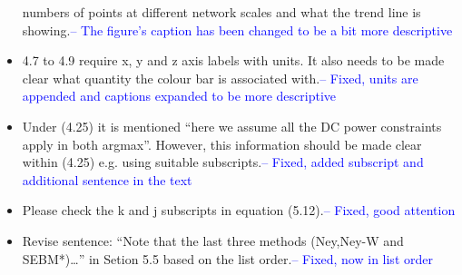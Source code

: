 \documentclass{article}
\begin{document}
\begin{itemize}
numbers of points at different network scales and what the trend line is
showing.\textcolor{blue}{-- The figure's caption has been changed to be a bit more descriptive}
\item	4.7 to 4.9 require x, y and z axis labels with units. It also needs to be made
clear what quantity the colour bar is associated with.\textcolor{blue}{-- Fixed, units are appended and captions expanded to be more descriptive}
\item	Under (4.25) it is mentioned “here we assume all the DC power constraints
apply in both argmax”. However, this information should be made clear within
(4.25) e.g. using suitable subscripts.\textcolor{blue}{-- Fixed, added subscript and additional sentence in the text}
\item	Please check the k and j subscripts in equation (5.12).\textcolor{blue}{-- Fixed, good attention}
\item	Revise sentence: “Note that the last three methods (Ney,Ney-W and
SEBM*)…” in Setion 5.5 based on the list order.\textcolor{blue}{-- Fixed, now in list order}
\end{itemize}
\end{document}
